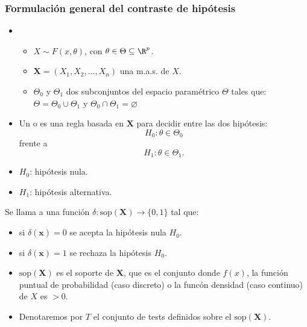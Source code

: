 \subsubsection{Formulación general del contraste de hipótesis}
\begin{itemize}[label=\color{red}\textbullet, leftmargin=*]
    \item {}
        \begin{itemize}[label=\textbullet]
            \item $X\sim F(x,\theta)$, con $\theta\in \Theta\subseteq \R^p$.
            \item $\mathbf{X}=(X_1,X_2,\dots,X_n)$ una m.a.s. de $X$.
            \item  $\Theta_0$ y $\Theta_1$ dos subconjuntos del espacio paramétrico $\Theta$ tales que:  $\Theta=\Theta_0\cup \Theta_1$ y $\Theta_0\cap \Theta_1=\varnothing$
        \end{itemize}
    \item {}

        Un  o  es una regla basada en $\mathbf{X}$ para decidir entre las dos hipótesis: \[
        H_0:\theta\in \Theta_0
        \]frente a \[
        H_1:\theta\in \Theta_1.
        \]    
\end{itemize}
\begin{tcolorbox}[colback=olive!5!white, colframe=olive!75!black, title=\textbf{Llamamos}]
\begin{itemize}[label=\textbullet]
    \item $H_0$: hipótesis nula.
    \item $H_1$: hipótesis alternativa.
\end{itemize}
\end{tcolorbox}
\begin{tcolorbox}[colback=blue!5!white, colframe=blue!75!black, title=\textbf{Definición}]
Se llama   a una función $\delta:\mathrm{sop}(\mathbf{X})\to \{0,1\} $ tal que:
\begin{itemize}[label=\textbullet]
    \item si $\delta(\mathbf{x})=0$ se acepta la hipótesis nula $H_0$.
    \item si $\delta(\mathbf{x})=1$ se rechaza la hipótesis $H_0$.
\end{itemize}
\end{tcolorbox}
\begin{tcolorbox}[colback=blue!5!white, colframe=blue!75!black, title=\textbf{Notación}]
\begin{itemize}[label=\textbullet]
    \item $\mathrm{sop}(\mathbf{X})$ es el soporte de $\mathbf{X}$, que es el conjunto donde $f(x)$, la función puntual de probabilidad (caso discreto) o la funcón densidad (caso continuo) de  $X$ es $>0$.
    \item Denotaremos por  $T$ el conjunto de tests definidos sobre el $\mathrm{sop}(\mathbf{X})$.
\end{itemize}
\end{tcolorbox}
